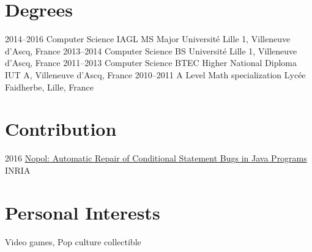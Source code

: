 \documentclass[hidelinks]{cv-style}          %
\begin{document}
\section{Degrees}
\begin{entrylist}

\entry
{2014--2016}
{Computer Science IAGL MS {\normalfont Major}}
{Université Lille 1, Villeneuve d'Ascq, France}
{\vspace{-0.3cm}}
\entry
{2013--2014}
{Computer Science BS}
{Université Lille 1, Villeneuve d'Ascq, France}
{\vspace{-0.3cm}}
\entry
{2011--2013}
{Computer Science BTEC Higher National Diploma}
{IUT A, Villeneuve d'Ascq, France}
{\vspace{-0.3cm}}
\entry
{2010--2011}
{A Level {\normalfont Math specialization}}
{Lycée Faidherbe, Lille, France}

{\vspace{-1.0cm}}
\end{entrylist}
\leavevmode
\section{Contribution}
\begin{entrylist}

\entry
{2016}
{\href{https://hal.archives-ouvertes.fr/hal-01285008}{Nopol: Automatic Repair of Conditional Statement Bugs in Java Programs}}
{INRIA}

{\vspace{-1.0cm}}
\end{entrylist}
\leavevmode


\section{Personal Interests}
\begin{entrylist}
\entry
{Video games, Pop culture collectible}
{}
{}

{\vspace{-1.0cm}}	
\end{entrylist}
\leavevmode
\end{document}
